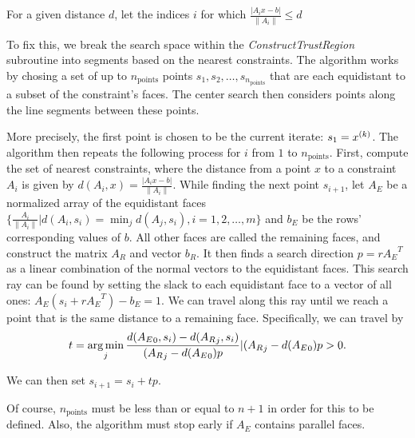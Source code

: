 For a given distance $d$, let the indices $i$ for which $\frac {|A_i x - b|}{\|A_i\|} \le d$


To fix this, we break the search space within the \emph{ConstructTrustRegion} subroutine into segments based on the nearest constraints.
The algorithm works by chosing a set of up to $n_{\text{points}}$ points $s_1, s_2, \ldots, s_{n_{\text{points}}}$ that are each equidistant to a subset of the constraint's faces.
The center search then considers points along the line segments between these points.

More precisely, the first point is chosen to be the current iterate: $s_1 = {x}^{(k)}$.
The algorithm then repeats the following process for $i$ from $1$ to $n_{\text{points}}$.
First, compute the set of nearest constraints, where the distance from a point $x$ to a constraint $A_i$ is given by $d(A_i, x) = \frac {|A_i x - b|}{\|A_i\|}$.
While finding the next point $s_{i+1}$, let  $A_E$ be a normalized array of the equidistant faces $\{\frac{A_i}{\|A_i\|} | d(A_i, s_i) = \min_j d(A_j, s_i), i = 1, 2, \ldots, m\}$ and $b_E$ be the rows' corresponding values of $b$.
All other faces are called the remaining faces, and construct the matrix $A_R$ and vector $b_R$.
It then finds a search direction $p  = r{A_E}^T$ as a linear combination of the normal vectors to the equidistant faces.
This search ray can be found by setting the slack to each equidistant face to a vector of all ones: $A_E(s_i + r{A_E}^T) - b_E = 1$.
We can travel along this ray until we reach a point that is the same distance to a remaining face.
Specifically, we can travel by 
\begin{align}
t = \operatorname*{arg\,min}_j {\frac{d({A_E}_0, s_i) - d({A_R}_j, s_i)}{ ({A_R}_j - d({A_E}_0) p} | ({A_R}_j - d({A_E}_0) p > 0 }. 
\end{align}

We can then set $s_{i+1} = s_{i} + t p$.

Of course, $n_{\text{points}}$ must be less than or equal to $n + 1$ in order for this to be defined.
Also, the algorithm must stop early if $A_E$ contains parallel faces.

